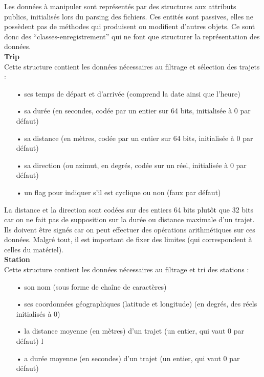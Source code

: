 \documentclass[12pt]{article}
\begin{document}
		Les données à manipuler sont représentés par des structures aux attributs publics,
		initialisés lors du parsing des fichiers. Ces entités sont passives, elles ne possèdent
		pas de méthodes qui produisent ou modifient d’autres objets. Ce sont
		donc des “classes-enregistrement” qui ne font que structurer la représentation des
		données.\\		
			
		\textbf{Trip}\\
		Cette structure contient les données nécessaires au filtrage et sélection des
		trajets :\\		
		\begin{itemize}
			\item[•]ses temps de départ et d’arrivée (comprend la date ainsi que l’heure)
			\item[•]sa durée (en secondes, codée par un entier sur 64 bits, initialisée à
			0 par défaut)
			\item[•]sa distance (en mètres, codée par un entier sur 64 bits, initialisée
			à 0 par défaut)
			\item[•]sa direction (ou azimut, en degrés, codée sur un réel, initialisée à
			0 par défaut)
			\item[•]un flag pour indiquer s’il est cyclique ou non (faux par défaut)\\
		\end{itemize}
			
		La distance et la direction sont codées sur des entiers 64 bits plutôt que 32 bits car on ne fait pas de supposition sur la durée ou distance maximale d’un trajet. Ils doivent être signés car on peut effectuer des opérations arithmétiques sur ces données. Malgré tout, il est important de fixer des limites (qui correspondent à celles du matériel).\\
			
		\textbf{Station}\\
		Cette structure contient les données nécessaires au filtrage et tri des stations :\\
		\begin{itemize}
			\item[•]son nom (sous forme de chaîne de caractères)
			\item[•]ses coordonnées géographiques (latitude et longitude) (en degrés,
			des réels initialisés à 0)
			\item[•]la distance moyenne (en mètres) d’un trajet (un entier, qui vaut 0 par défaut)
			l\item[•]a durée moyenne (en secondes) d’un trajet (un entier, qui vaut 0 par défaut)
		\end{itemize}
			
\end{document}
